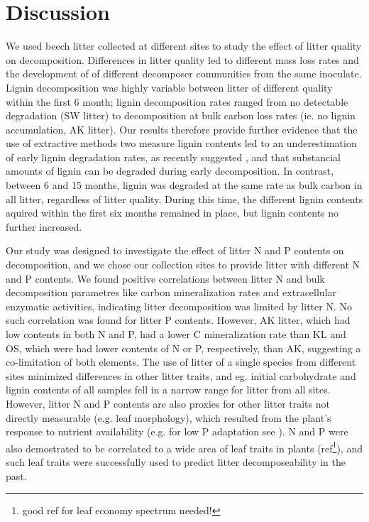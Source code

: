 \section*{Discussion}

We used beech litter collected at different sites to study the effect of litter quality on decomposition. Differences in litter quality led to different mass loss rates and the development of of different decomposer communities from the same inoculate. Lignin decomposition  was highly variable between litter of different quality within the first 6 month; lignin decomposition rates ranged from no detectable degradation (SW litter) to decomposition at bulk carbon loss rates (ie. no lignin accumulation, AK litter). Our results therefore provide further evidence that the use of extractive methods two measure lignin contents led to an underestimation of early lignin degradation rates, as recently suggested \cite{Klotzbucher2011}, and that substancial amounts of lignin can be degraded during early decomposition. In contrast, between 6 and 15 months, lignin was degraded at the same rate as bulk carbon in all litter, regardless of litter quality. During this time, the different lignin contents aquired within the first six months remained in place, but lignin contents no further increased.  

Our study was designed to investigate the effect of litter N and P contents on decomposition, and we chose our collection sites to provide litter with different N and P contents. We found positive correlations between litter N and bulk decomposition parametres like carbon mineralization rates and extracellular enzymatic activities, indicating litter decomposition was limited by litter N. No such correlation was found for litter P contents. However, AK litter, which had low contents in both N and P, had a lower C mineralization rate than KL and OS, which were had lower contents of N or P, respectively, than AK, suggesting a co-limitation of both elements. The use of litter of a single species from different sites minimized differences in other litter traits, and eg. initial carbohydrate and lignin contents of all samples fell in a narrow range for litter from all sites. However, litter N and P contents are also proxies for other litter traits not directly measurable (e.g. leaf morphology), which resulted from the plant’s response to nutrient availability (e.g. for low P adaptation see \cite{Vance2003}). N and P were also demostrated to be correlated to a wide area of leaf traits in plants (ref\footnote{good ref for leaf economy spectrum needed!}), and such leaf traits were successfully used to predict litter decomposeability in the past\cite{Cornelissen1997}. 

